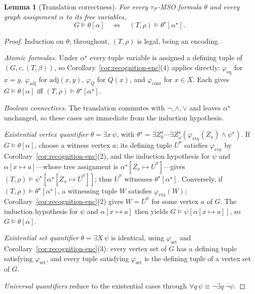 \documentclass[11pt]{article}
\newtheorem{lemma}[theorem]{Lemma}
\theoremstyle{definition}
\newcommand{\vtx}{\mathrm{vtx}}
\newcommand{\set}{\mathrm{set}}
\newcommand{\adj}{\mathrm{adj}}
\newcommand{\Pred}{\mathcal P}
\newcommand{\eq}{\mathrm{eq}}
\newcommand{\cont}{\mathrm{cont}}
\newcommand{\tuple}[1]{\overline{#1}}
\begin{document}
\begin{lemma}[Translation correctness]\label{lem:translation}
For every \(\tau_{\Pred}\)-MSO{} formula \(\theta\) and every graph assignment
\(\alpha\) to its free variables,
\[
  G\models\theta[\alpha]
  \quad\Longleftrightarrow\quad
  (T,\rho)\models\theta^\star[\alpha^\star].
\]
\end{lemma}

\begin{proof}
Induction on \(\theta\); throughout, \((T,\rho)\) is legal, being an encoding.

\emph{Atomic formulas.}  Under \(\alpha^\star\) every tuple variable is assigned a
defining tuple of \((G,c,(T,\beta))\), so
Corollary~\ref{cor:recognition-enc}(4) applies directly:
\(\varphi_{\eq}\) for \(x=y\), \(\varphi_{\adj}\) for \(\adj(x,y)\),
\(\varphi_Q\) for \(Q(x)\), and \(\varphi_{\cont}\) for \(x\in X\).  Each
gives \(G\models\theta[\alpha]\) iff \((T,\rho)\models\theta^\star[\alpha^\star]\).

\emph{Boolean connectives.}  The translation commutes with \(\neg,\wedge,\vee\)
and leaves \(\alpha^\star\) unchanged, so these cases are immediate from the
induction hypothesis.

\emph{Existential vertex quantifier} \(\theta=\exists x\,\psi\), with
\(\theta^\star=\exists Z^x_0\cdots\exists Z^x_\omega
(\varphi_{\vtx}(\tuple Z_x)\wedge\psi^\star)\).  If \(G\models\theta[\alpha]\),
choose a witness vertex \(a\); its defining tuple \(\tuple U^a\) satisfies
\(\varphi_{\vtx}\) by Corollary~\ref{cor:recognition-enc}(2), and the
induction hypothesis for
\(\psi\) and \(\alpha[x\mapsto a]\)---whose tree assignment is
\(\alpha^\star[\tuple Z_x\mapsto\tuple U^a]\)---gives
\((T,\rho)\models\psi^\star[\alpha^\star[\tuple Z_x\mapsto\tuple U^a]]\); thus
\(\tuple U^a\) witnesses \(\theta^\star[\alpha^\star]\).  Conversely, if
\((T,\rho)\models\theta^\star[\alpha^\star]\), a witnessing tuple \(W\) satisfies
\(\varphi_{\vtx}(W)\); Corollary~\ref{cor:recognition-enc}(2) gives
\(W=\tuple U^a\) for some vertex \(a\) of \(G\).  The induction hypothesis for \(\psi\) and
\(\alpha[x\mapsto a]\) then yields \(G\models\psi[\alpha[x\mapsto a]]\), so
\(G\models\theta[\alpha]\).

\emph{Existential set quantifier} \(\theta=\exists X\,\psi\) is identical, using
\(\varphi_{\set}\) and Corollary~\ref{cor:recognition-enc}(3): every vertex set
of \(G\) has a defining tuple satisfying \(\varphi_{\set}\), and every tuple
satisfying \(\varphi_{\set}\) is the defining tuple of a vertex set of \(G\).

\emph{Universal quantifiers} reduce to the existential cases through
\(\forall q\,\psi\equiv\neg\exists q\,\neg\psi\).
\end{proof}
\end{document}
